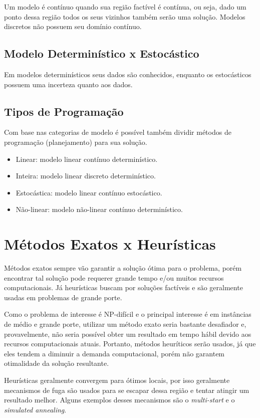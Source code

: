 Um modelo é contínuo quando sua região factível é contínua, ou seja, dado um ponto dessa região todos os seus vizinhos também serão uma solução.
Modelos discretos não possuem seu domínio contínuo.

\subsection{Modelo Determinístico x Estocástico}\label{subsec:modelo-deterministico-x-estocastico}

Em modelos determinísticos seus dados são conhecidos, enquanto os estocásticos possuem uma incerteza quanto aos dados.

\subsection{Tipos de Programação}\label{subsec:tipos-de-programacao}

Com base nas categorias de modelo é possível também dividir métodos de programação (planejamento) para sua solução.

\begin{itemize}
    \item Linear: modelo linear contínuo determinístico.
    \item Inteira: modelo linear discreto determinístico.
    \item Estocástica: modelo linear contínuo estocástico.
    \item Não-linear: modelo não-linear contínuo determinístico.
\end{itemize}


\section{Métodos Exatos x Heurísticas}\label{sec:metodos-exatos-x-heuristicas}

Métodos exatos sempre vão garantir a solução ótima para o problema, porém encontrar tal solução pode requerer grande tempo e/ou muitos recursos computacionais.
Já heurísticas buscam por soluções factíveis e são geralmente usadas em problemas de grande porte.

Como o problema de interesse é NP-difícil e o principal interesse é em instâncias de médio e grande porte, utilizar um método exato seria bastante desafiador e, provavelmente, não seria possível obter um resultado em tempo hábil devido aos recursos computacionais atuais.
Portanto, métodos heuríticos serão usados, já que eles tendem a diminuir a demanda computacional, porém não garantem otimalidade da solução resultante.

Heurísticas geralmente convergem para ótimos locais, por isso geralmente mecanismos de fuga são usados para se escapar dessa região e tentar atingir um resultado melhor.
Alguns exemplos desses mecanismos são o \textit{multi-start} e o \textit{simulated annealing}.
